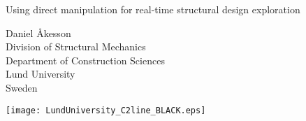 \documentclass[twoside,openright,11pt]{book}
\begin{document}


\frontmatter

\begin{titlepage}
  \center
  \null
  \vspace{6cm}
  
  {\Huge Using direct manipulation for real-time structural design exploration}

  \vspace{2cm}
  
  \Large{Daniel Åkesson \\ Division of Structural Mechanics \\ Department of Construction Sciences \\ Lund University \\ Sweden}
  \vspace{1cm}
  
  \texttt{[image: LundUniversity\_C2line\_BLACK.eps]}
\end{titlepage} 


\pagestyle{plain}

 
\newpage

 
\clearpage %

\cleardoublepage

\cleardoublepage %


\cleardoublepage %


\cleardoublepage %

\tableofcontents

 
\end{document}
